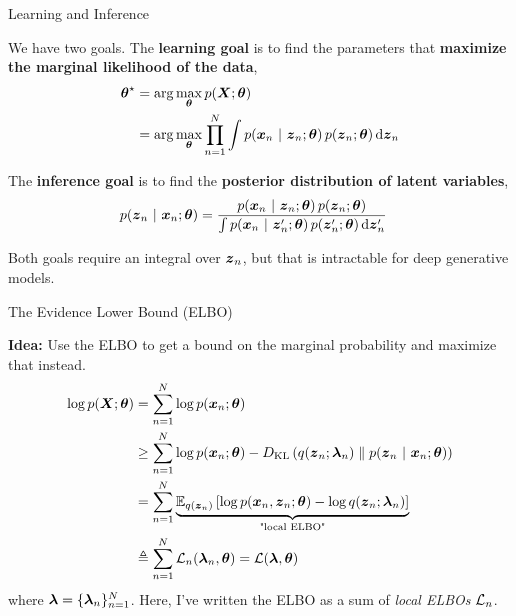 \documentclass[aspectratio=169]{beamer}
\begin{document}
\begin{frame}[t,allowframebreaks]{Learning and Inference}\label{learning-and-inference}

We have two goals. The \textbf{learning goal} is to find the parameters
that \textbf{maximize the marginal likelihood of the data},
\begin{align*}
    \boldsymbol{\theta}^\star 
    &= \arg \max_{\boldsymbol{\theta}} p(\boldsymbol{X}; \boldsymbol{\theta})\\
    &= \arg \max_{\boldsymbol{\theta}} \prod_{n=1}^N \int p(\boldsymbol{x}_n ~\vert~ \boldsymbol{z}_n; \boldsymbol{\theta}) \, p(\boldsymbol{z}_n; \boldsymbol{\theta}) \mathop{}\!\mathrm{d} \boldsymbol{z}_n
\end{align*}

The \textbf{inference goal} is to find the \textbf{posterior
distribution of latent variables}, \begin{align*}
    p(\boldsymbol{z}_n ~\vert~ \boldsymbol{x}_n; \boldsymbol{\theta}) 
    &= \frac{p(\boldsymbol{x}_n ~\vert~ \boldsymbol{z}_n; \boldsymbol{\theta}) \, p(\boldsymbol{z}_n; \boldsymbol{\theta})}{\int p(\boldsymbol{x}_n ~\vert~ \boldsymbol{z}_n'; \boldsymbol{\theta}) \, p(\boldsymbol{z}_n'; \boldsymbol{\theta})\mathop{}\!\mathrm{d} \boldsymbol{z}_n'}
\end{align*}

Both goals require an integral over \(\boldsymbol{z}_n\), but that is intractable
for deep generative models.
\end{frame}

\begin{frame}[t,allowframebreaks]{The Evidence Lower Bound
(ELBO)}\label{the-evidence-lower-bound-elbo}

\textbf{Idea:} Use the ELBO to get a bound on the marginal probability
and maximize that instead. \begin{align*}
\log p(\boldsymbol{X} ; \boldsymbol{\theta}) 
&= \sum_{n=1}^N \log p(\boldsymbol{x}_n; \boldsymbol{\theta}) \\
&\geq \sum_{n=1}^N \log p(\boldsymbol{x}_n; \boldsymbol{\theta}) - D_{\textrm{KL}}\left(q(\boldsymbol{z}_n; \boldsymbol{\lambda}_n)\;\|\;p(\boldsymbol{z}_n ~\vert~ \boldsymbol{x}_n; \boldsymbol{\theta})\right) \\
&= \sum_{n=1}^N \underbrace{\mathbb{E}_{q(\boldsymbol{z}_n)}\left[ \log p(\boldsymbol{x}_n, \boldsymbol{z}_n; \boldsymbol{\theta}) - \log q(\boldsymbol{z}_n; \boldsymbol{\lambda}_n) \right]}_{\text{"local ELBO"}} \\
&\triangleq \sum_{n=1}^N \mathcal{L}_n(\boldsymbol{\lambda}_n, \boldsymbol{\theta}) 
= \mathcal{L}(\boldsymbol{\lambda}, \boldsymbol{\theta})
\end{align*} where \(\boldsymbol{\lambda} = \{\boldsymbol{\lambda}_n\}_{n=1}^N\).
Here, I've written the ELBO as a sum of \emph{local ELBOs} \(\mathcal{L}_n\).
\end{frame}
\end{document}
